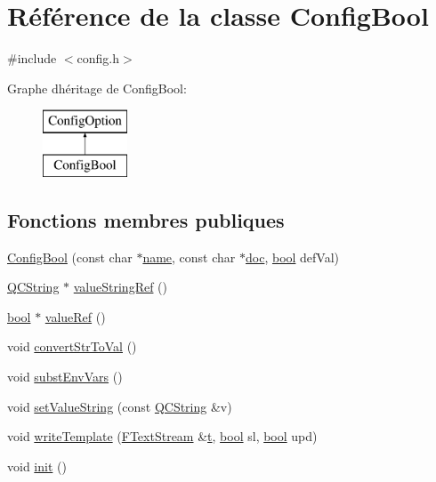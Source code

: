 \hypertarget{class_config_bool}{}\section{Référence de la classe Config\+Bool}
\label{class_config_bool}


{\ttfamily \#include $<$config.\+h$>$}

Graphe d\textquotesingle{}héritage de Config\+Bool\+:\begin{figure}[H]
\begin{center}
\leavevmode
\includegraphics[height=2.000000cm]{class_config_bool}
\end{center}
\end{figure}
\subsection*{Fonctions membres publiques}
\begin{DoxyCompactItemize}
\item 
\hyperlink{class_config_bool_a0250b41f09141944729a556c4d5f8146}{Config\+Bool} (const char $\ast$\hyperlink{class_config_option_a2f226c32b0c447c1fa628660f42859c4}{name}, const char $\ast$\hyperlink{vhdljjparser_8cpp_a9910424bf5401d657c3b3fdff6fcc152}{doc}, \hyperlink{qglobal_8h_a1062901a7428fdd9c7f180f5e01ea056}{bool} def\+Val)
\item 
\hyperlink{class_q_c_string}{Q\+C\+String} $\ast$ \hyperlink{class_config_bool_a71f105a81fcc98a2c11a807a51c67171}{value\+String\+Ref} ()
\item 
\hyperlink{qglobal_8h_a1062901a7428fdd9c7f180f5e01ea056}{bool} $\ast$ \hyperlink{class_config_bool_ab42eaac6320038f3ddeb73900e98d898}{value\+Ref} ()
\item 
void \hyperlink{class_config_bool_a5ebdef58b033f43ea09b1e5b0b44e330}{convert\+Str\+To\+Val} ()
\item 
void \hyperlink{class_config_bool_af9c3c0887533842db8cf9201a5b63486}{subst\+Env\+Vars} ()
\item 
void \hyperlink{class_config_bool_acfabddfc8b65f1850cb7b1bdfcfb6ae1}{set\+Value\+String} (const \hyperlink{class_q_c_string}{Q\+C\+String} \&v)
\item 
void \hyperlink{class_config_bool_aab61095cad30bfb2e184eb389d4d4472}{write\+Template} (\hyperlink{class_f_text_stream}{F\+Text\+Stream} \&\hyperlink{058__bracket__recursion_8tcl_a69e959f6901827e4d8271aeaa5fba0fc}{t}, \hyperlink{qglobal_8h_a1062901a7428fdd9c7f180f5e01ea056}{bool} sl, \hyperlink{qglobal_8h_a1062901a7428fdd9c7f180f5e01ea056}{bool} upd)
\item 
void \hyperlink{class_config_bool_a087fdcc229617e80faf798e90fe17439}{init} ()
\end{DoxyCompactItemize}

